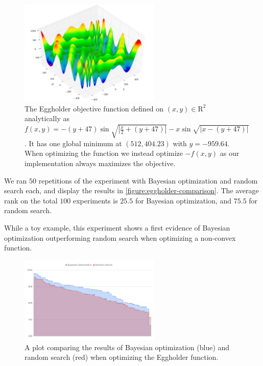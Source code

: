 \begin{figure}[h!]
	\begin{center}
		\includegraphics[width=0.6\textwidth]{images/eggholder.png}
		\caption{The Eggholder objective function defined on $(x, y) \in \mathrm{R}^2$ analytically as $f(x, y) = -(y + 47) \sin \sqrt{| \frac{x}{2} + (y + 47)|} - x \sin \sqrt{| x - (y + 47)|} $. It has one global minimum at $(512, 404.23)$ with $y = -959.64$. When optimizing the function we instead optimize $-f(x,y)$ as our implementation always maximizes the objective.}
		\label{figure:eggholder}
	\end{center}
\end{figure}

We ran $50$ repetitions of the experiment with Bayesian optimization and random search each, and display the results in \autoref{figure:eggholder-comparison}. The average rank on the total $100$ experiments is $25.5$ for Bayesian optimization, and $75.5$ for random search.

While a toy example, this experiment shows a first evidence of Bayesian optimization outperforming random search when optimizing a non-convex function.

\begin{figure}
	\begin{center}
		\includegraphics[width=0.6\textwidth]{images/eggholder-comparison.png}
		\caption{A plot comparing the results of Bayesian optimization (blue) and random search (red) when optimizing the Eggholder function.}
		\label{figure:eggholder-comparison}
	\end{center}
\end{figure}


